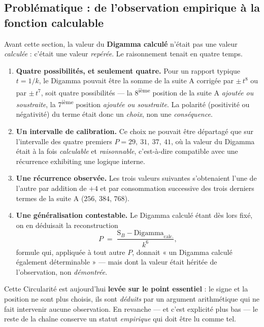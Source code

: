\documentclass[11pt,a4paper]{article}
\newcommand{\SB}{\mathrm{S}_B}
\begin{document}
\subsection{Problématique : de l'observation empirique à la fonction calculable}

Avant cette section, la valeur du \textbf{Digamma calculé} n'était pas une
valeur \emph{calculée} : c'était une valeur \emph{repérée}. Le raisonnement
tenait en quatre temps.

\begin{enumerate}[nosep,leftmargin=*]
  \item \textbf{Quatre possibilités, et seulement quatre.} Pour un rapport
    typique $t = 1/k$, le Digamma pouvait être la somme de la suite A
    corrigée par $\pm\,t^{8}$ ou par $\pm\,t^{7}$, soit quatre
    possibilités --- la 8\textsuperscript{ième} position de la suite A
   \emph{ajoutée ou soustraite}, la 7\textsuperscript{ième} position
    \emph{ajoutée ou soustraite}. La polarité (positivité ou négativité)
    du terme était donc un \emph{choix}, non une \emph{conséquence}.
  \item \textbf{Un intervalle de calibration.} Ce choix ne pouvait être
    départagé que sur l'intervalle des quatre premiers
    $P = 29,\ 31,\ 37,\ 41$, où la valeur du Digamma était à la fois
    \emph{calculable} et \emph{raisonnable}, c'est-à-dire compatible avec
    une récurrence exhibiting une logique interne.
  \item \textbf{Une récurrence observée.} Les trois valeurs suivantes
    s'obtenaient l'une de l'autre par addition de $+4$ et par
    consommation successive des trois derniers termes de la suite A
    ($256$, $384$, $768$).
  \item \textbf{Une généralisation contestable.} Le Digamma calculé
    étant dès lors fixé, on en déduisait la reconstruction
    \[
      P \;=\; \frac{\SB - \mathrm{Digamma}_{\mathrm{calc.}}}{k^{6}},
    \]
    formule qui, appliquée à tout autre $P$, donnait « un Digamma
    calculé également déterminable » --- mais dont la valeur était
    héritée de l'observation, non \emph{démontrée}.
\end{enumerate}

\vspace{0.3cm}
\begin{boitealerte}
Cette Circularité est aujourd'hui \textbf{levée sur le point
essentiel} : le signe et la position ne sont plus choisis, ils sont
\emph{déduits} par un argument arithmétique qui ne fait intervenir
aucune observation. En revanche --- et c'est explicité plus bas --- le
reste de la chaîne conserve un statut \emph{empirique} qui doit être lu
comme tel.
\end{boitealerte}
\end{document}
